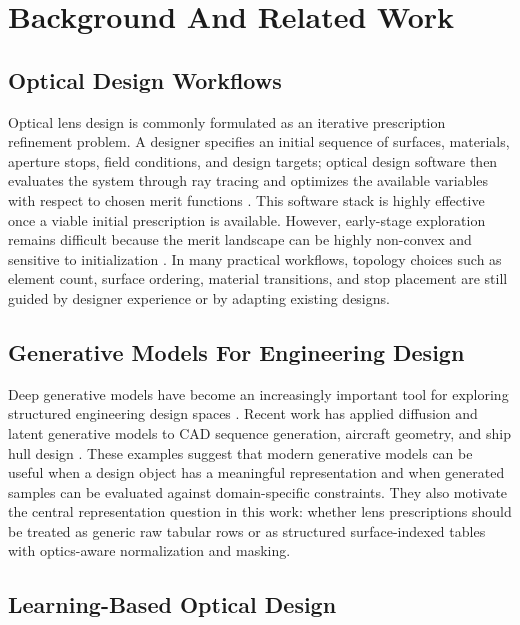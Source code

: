 \section{Background And Related Work}

\subsection{Optical Design Workflows}

Optical lens design is commonly formulated as an iterative prescription refinement problem. A designer specifies an initial sequence of surfaces, materials, aperture stops, field conditions, and design targets; optical design software then evaluates the system through ray tracing and optimizes the available variables with respect to chosen merit functions \cite{Smith2008ModernOpticalEngineering,codev,zemax_opticstudio}. This software stack is highly effective once a viable initial prescription is available. However, early-stage exploration remains difficult because the merit landscape can be highly non-convex and sensitive to initialization \cite{Turnhout:09}. In many practical workflows, topology choices such as element count, surface ordering, material transitions, and stop placement are still guided by designer experience or by adapting existing designs.

\subsection{Generative Models For Engineering Design}

Deep generative models have become an increasingly important tool for exploring structured engineering design spaces \cite{regenwetter2022deepgenerativemodelsengineering}. Recent work has applied diffusion and latent generative models to CAD sequence generation, aircraft geometry, and ship hull design \cite{alam2025gencadimageconditionedcomputeraideddesign,blendednet_pp_Sung_2025,bagazinski2023shipgendiffusionmodelparametric}. These examples suggest that modern generative models can be useful when a design object has a meaningful representation and when generated samples can be evaluated against domain-specific constraints. They also motivate the central representation question in this work: whether lens prescriptions should be treated as generic raw tabular rows or as structured surface-indexed tables with optics-aware normalization and masking.

\subsection{Learning-Based Optical Design}


